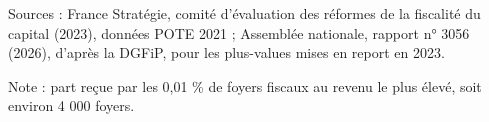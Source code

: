Sources : France Stratégie, comité d'évaluation des réformes de la fiscalité du capital (2023), données POTE 2021 ; Assemblée nationale, rapport n° 3056 (2026), d'après la DGFiP, pour les plus-values mises en report en 2023.\par Note : part reçue par les 0,01 \% de foyers fiscaux au revenu le plus élevé, soit environ 4 000 foyers.
